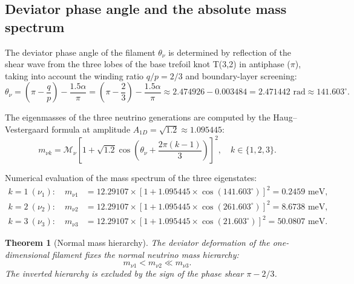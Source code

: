 \documentclass[11pt,a4paper]{article}
\newtheorem{theorem}{Theorem}
\theoremstyle{definition}
\theoremstyle{remark}
\begin{document}
\subsection{Deviator phase angle and the absolute mass spectrum}
	
The deviator phase angle of the filament $\theta_\nu$ is determined by reflection of the shear wave from the three lobes of the base trefoil knot T(3,2) in antiphase ($\pi$), taking into account the winding ratio $q/p = 2/3$ and boundary-layer screening:
\begin{equation}
	\theta_\nu = \left( \pi - \frac{q}{p} \right) - \frac{1.5\alpha}{\pi} = \left( \pi - \frac{2}{3} \right) - \frac{1.5\alpha}{\pi} \approx 2.474926 - 0.003484 = 2.471442\text{ rad} \approx 141.603^\circ.
	\label{eq:neutrino_lode_angle}
\end{equation}
	
The eigenmasses of the three neutrino generations are computed by the Haug--Vestergaard formula at amplitude $A_{1D} = \sqrt{1.2} \approx 1.095445$:
\begin{equation}
	m_{\nu k} = \mathcal{M}_\nu \left[ 1 + \sqrt{1.2} \cos\left( \theta_\nu + \frac{2\pi(k-1)}{3} \right) \right]^2, \quad k \in \{1, 2, 3\}.
	\label{eq:neutrino_mass_eigenstates}
\end{equation}
	
Numerical evaluation of the mass spectrum of the three eigenstates:
\begin{align}
	k=1 \ (\nu_1): \quad m_{\nu 1} &= 12.29107 \times [1 + 1.095445 \times \cos(141.603^\circ)]^2 = 0.2459\text{ meV}, \label{eq:m_nu1_val} \\
	k=2 \ (\nu_2): \quad m_{\nu 2} &= 12.29107 \times [1 + 1.095445 \times \cos(261.603^\circ)]^2 = 8.6738\text{ meV}, \label{eq:m_nu2_val} \\
	k=3 \ (\nu_3): \quad m_{\nu 3} &= 12.29107 \times [1 + 1.095445 \times \cos(21.603^\circ)]^2 = 50.0807\text{ meV}. \label{eq:m_nu3_val}
\end{align}
	
\begin{theorem}[Normal mass hierarchy]
\label{thm:neutrino_normal_hierarchy}
The deviator deformation of the one-dimensional filament fixes the normal neutrino mass hierarchy:
\begin{equation}
	m_{\nu 1} < m_{\nu 2} \ll m_{\nu 3}.
	\label{eq:neutrino_hierarchy_condition}
\end{equation}
The inverted hierarchy is excluded by the sign of the phase shear $\pi - 2/3$.
\end{theorem}
\end{document}
